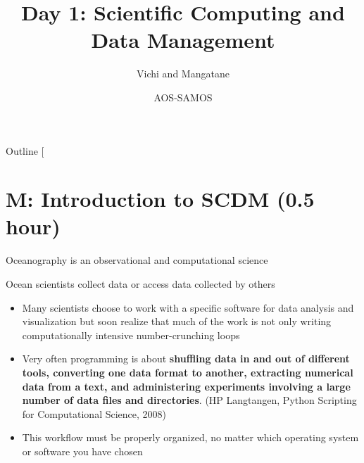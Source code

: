 \documentclass[english,aspectratio=169]{beamer}
\makeatletter
\let\origtableofcontents=\tableofcontents
\def\tableofcontents{\@ifnextchar[{\origtableofcontents}{\gobbletableofcontents}}
\def\gobbletableofcontents#1{\origtableofcontents}
\makeatother
\begin{document}
    \title[Core 3 ]{Day 1: Scientific Computing and Data Management}
    \author{Vichi and Mangatane}
    \date{AOS-SAMOS}
    \maketitle

\begin{frame}{Outline}
    \tableofcontents{}
\end{frame}

\section{M: Introduction to SCDM (0.5 hour)}

\begin{frame}{Oceanography is an observational and computational science}

\begin{fact}
Ocean scientists collect data or access data collected by others
\end{fact}

\begin{itemize}
\item {\small{}Many scientists choose to work with a specific software for
data analysis and visualization but soon realize that much of the
work is not only writing computationally intensive number-crunching
loops}{\small\par}
\item {\small{}Very often programming is about }\textbf{\small{}shuffling
data in and out of different tools, converting one data format to another, extracting numerical data from a text, and administering experiments involving a large number of data files and directories}{\small{}.
(HP Langtangen, Python Scripting for Computational Science, 2008)}{\small\par}
\item This workflow must be properly organized, no matter which operating
system or software you have chosen
\end{itemize}
\end{frame}
\end{document}
